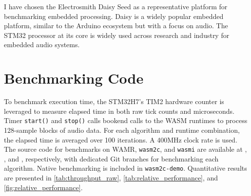 I have chosen the Electrosmith Daisy Seed as a representative platform for benchmarking embedded processing. Daisy is a widely popular embedded platform, similar to the Arduino\cite{arduino} ecosystem but with a focus on audio. The STM32 processor at its core is widely used across research and industry for embedded audio systems\cite{emilyharpist}\cite{diamond2025memorylane}\cite{jongsataporn2025embedded}.

\section { Benchmarking Code }

To benchmark execution time, the STM32H7's TIM2 hardware counter is leveraged to measure elapsed time in both raw tick counts and microseconds. Timer \lstinline{start()} and \lstinline{stop()} calls bookend calls to the WASM runtimes to process 128-sample blocks of audio data. For each algorithm and runtime combination, the elapsed time is averaged over 100 iterations. A 400MHz clock rate is used. The source code for benchmarks on WAMR, \lstinline{wasm2c}, and \lstinline{wasmi} are available at \cite{wamrRepo}, \cite{wasm2cRepo}, and \cite{wasmiRepo}, respectively, with dedicated Git branches for benchmarking each algorithm. Native benchmarking is included in \lstinline{wasm2c-demo}. Quantitative results are presented in \autoref{tab:throughput_raw}, \autoref{tab:relative_performance}, and \autoref{fig:relative_performance}.

\vspace{12pt}

\begin{table}[ht]
\caption{\itshape Raw sample throughput (samples/sec) across runtimes. \\
Cells shaded green represent algorithm/runtime combinations with throughput greater than 48kHz, indicating real-time performance}
\centering
{}
\label{tab:throughput_raw}
\end{table}



